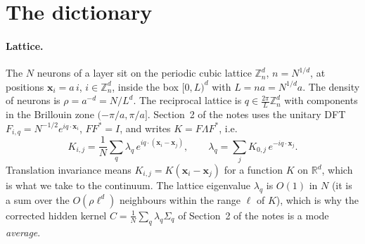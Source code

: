 \documentclass[11pt,a4paper]{article}
\newcommand{\R}{\mathbb R}
\newcommand{\Z}{\mathbb Z}
\begin{document}
\section{The dictionary}
\label{sec:dictionary}

\paragraph{Lattice.}
The $N$ neurons of a layer sit on the periodic cubic lattice $\Z_n^d$, $n = N^{1/d}$, at positions $\mathbf x_i = a\,i$, $i\in\Z_n^d$, inside the box $[0,L)^d$ with $L = n a = N^{1/d} a$. The density of neurons is $\rho = a^{-d} = N/L^d$. The reciprocal lattice is $q\in\frac{2\pi}{L}\Z_n^d$ with components in the Brillouin zone $(-\pi/a,\pi/a]$. Section~2 of the notes uses the unitary DFT $F_{i,q} = N^{-1/2}e^{iq\cdot\mathbf x_i}$, $F F^* = I$, and writes $K = F\Lambda F^*$, i.e.
\begin{equation}
  K_{i,j} = \frac1N\sum_q \lambda_q\, e^{iq\cdot(\mathbf x_i-\mathbf x_j)},
  \qquad
  \lambda_q = \sum_j K_{0,j}\,e^{-iq\cdot\mathbf x_j}.
  \label{eq:lattice-spectrum}
\end{equation}
Translation invariance means $K_{i,j} = K(\mathbf x_i - \mathbf x_j)$ for a function $K$ on $\R^d$, which is what we take to the continuum. The lattice eigenvalue $\lambda_q$ is $O(1)$ in $N$ (it is a sum over the $O(\rho\ell^d)$ neighbours within the range $\ell$ of $K$), which is why the corrected hidden kernel $C = \frac1N\sum_q\lambda_q\Sigma_q$ of Section~2 of the notes is a mode \emph{average}.
\end{document}
